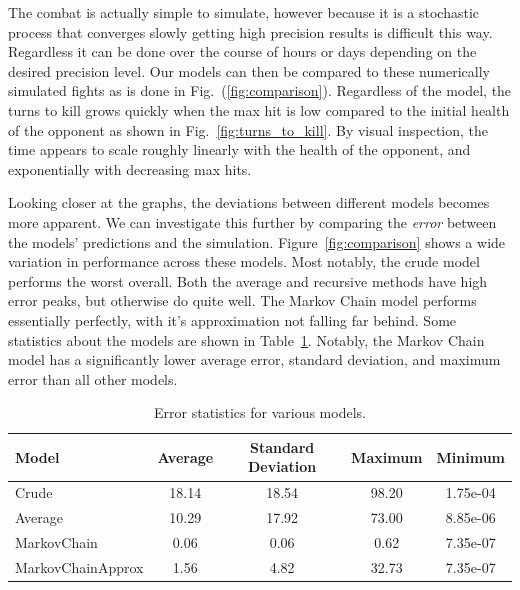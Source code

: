 			The combat is actually simple to simulate, however because it is a stochastic process that converges slowly getting high precision results is difficult this way. Regardless it can be done over the course of hours or days depending on the desired precision level. Our models can then be compared to these numerically simulated fights as is done in Fig.~(\ref{fig:comparison}). Regardless of the model, the turns to kill grows quickly when the max hit is low compared to the initial health of the opponent as shown in Fig.~\ref{fig:turns_to_kill}. By visual inspection, the time appears to scale roughly linearly with the health of the opponent, and exponentially with decreasing max hits.

			Looking closer at the graphs, the deviations between different models becomes more apparent. We can investigate this further by comparing the \textit{error} between the models' predictions and the simulation. Figure~\ref{fig:comparison} shows a wide variation in performance across these models. Most notably, the crude model performs the worst overall. Both the average and recursive methods have high error peaks, but otherwise do quite well. The Markov Chain model performs essentially perfectly, with it's approximation not falling far behind. Some statistics about the models are shown in Table~\ref{table:model_comp_stats}. Notably, the Markov Chain model has a significantly lower average error, standard deviation, and maximum error than all other models.

			\begin{table}[h]
			        \centering
			        \begin{tabular}{ l | c c c c }
			                Model & Average & Standard Deviation & Maximum & Minimum \\
			                \hline\hline
			                Crude & 18.14 & 18.54 & 98.20 & 1.75e-04 \\
			                Average & 10.29 & 17.92 & 73.00 & 8.85e-06 \\
			                MarkovChain & 0.06 & 0.06 & 0.62 & 7.35e-07 \\
			                MarkovChainApprox & 1.56 & 4.82 & 32.73 & 7.35e-07 \\
			        \end{tabular}
			        \caption{Error statistics for various models.}
			        \label{table:model_comp_stats}
			\end{table}

